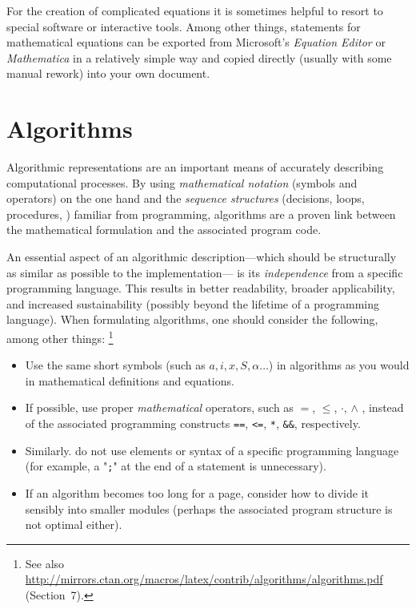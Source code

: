 For the creation of complicated equations it is sometimes helpful to resort 
to special software or interactive tools. Among other things, \latex statements
for mathematical equations can be exported from Microsoft's \emph{Equation Editor}
or \emph{Mathematica} in a relatively simple way and copied directly (usually
with some manual rework) into your own \latex document.


\section{Algorithms}


Algorithmic representations are an important means of accurately describing
computational processes. By using \emph{mathematical notation} (symbols and 
operators) on the one hand and the \emph{sequence structures} (decisions, 
loops, procedures, \etc) familiar from programming, algorithms are a proven 
link between the mathematical formulation and the associated program code.

An essential aspect of an algorithmic description---which should be
structurally as similar as possible to the implementation--- is its
\emph{independence} from a specific programming language.
This results in better readability, broader applicability, and increased
sustainability (possibly beyond the lifetime of a programming language).
When formulating algorithms, one should consider the following, among other
things:%
\footnote{See also
\url{http://mirrors.ctan.org/macros/latex/contrib/algorithms/algorithms.pdf}
(Section~7).}
%
\begin{itemize}
	\item
	Use the same short symbols (such as $a, i, x, S, \alpha \ldots$) in
	algorithms as you would in mathematical definitions and equations.
	\item
	If possible, use proper \emph{mathematical} operators, such as 
  $=$, $\leq$, $\cdot$, $\wedge$ \etc,
  instead of the associated programming constructs 
  \texttt{==}, \texttt{<=}, \texttt{*}, \texttt{\&\&}, respectively.
	\item
	Similarly. do not use elements or syntax of a specific programming language (for
	example, a "\texttt{;}" at the end of a statement is unnecessary).
	\item
	If an algorithm becomes too long for a page, consider how to divide it
	sensibly into smaller modules (perhaps the associated program structure
	is not optimal either).
\end{itemize}

